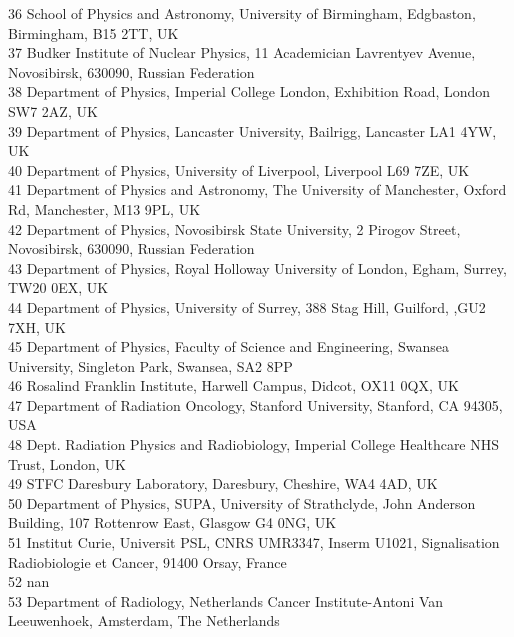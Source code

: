 {\begin{tabbing}
     36 \> School of Physics and Astronomy, University of Birmingham, Edgbaston, Birmingham, B15 2TT, UK\\
     37 \> Budker Institute of Nuclear Physics, 11 Academician Lavrentyev Avenue, Novosibirsk, 630090, Russian Federation\\
     38 \> Department of Physics, Imperial College London, Exhibition Road, London SW7 2AZ, UK\\
     39 \> Department of Physics, Lancaster University, Bailrigg, Lancaster LA1 4YW, UK\\
     40 \> Department of Physics, University of Liverpool, Liverpool L69 7ZE, UK\\
     41 \> Department of Physics and Astronomy, The University of Manchester, Oxford Rd, Manchester, M13 9PL, UK\\
     42 \> Department of Physics, Novosibirsk State University, 2 Pirogov Street, Novosibirsk, 630090, Russian Federation\\
     43 \> Department of Physics, Royal Holloway University of London, Egham, Surrey, TW20 0EX, UK\\
     44 \> Department of Physics, University of Surrey, 388 Stag Hill, Guilford, ,GU2 7XH, UK\\
     45 \> Department of Physics, Faculty of Science and Engineering, Swansea University, Singleton Park, Swansea, SA2 8PP\\
     46 \> Rosalind Franklin Institute, Harwell Campus, Didcot, OX11 0QX, UK\\
     47 \> Department of Radiation Oncology, Stanford University, Stanford, CA 94305, USA\\
     48 \> Dept. Radiation Physics and Radiobiology, Imperial College Healthcare NHS Trust, London, UK\\
     49 \> STFC Daresbury Laboratory, Daresbury, Cheshire, WA4 4AD, UK\\
     50 \> Department of Physics, SUPA, University of Strathclyde, John Anderson Building, 107 Rottenrow East, Glasgow G4 0NG, UK\\
     51 \> Institut Curie, Universit PSL, CNRS UMR3347, Inserm U1021, Signalisation Radiobiologie et Cancer, 91400 Orsay, France\\
     52 \> nan\\
     53 \> Department of Radiology, Netherlands Cancer Institute-Antoni Van Leeuwenhoek, Amsterdam, The Netherlands\\
    ~   \> \\
  \end{tabbing}
}
